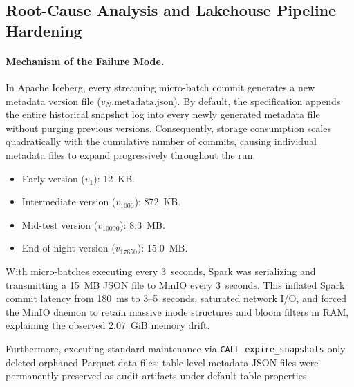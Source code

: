 \subsection{Root-Cause Analysis and Lakehouse Pipeline Hardening}
\label{subsec:eval_hardening}

\paragraph{Mechanism of the Failure Mode.}
In Apache Iceberg, every streaming micro-batch commit generates a new metadata version file ($v_N\text{.metadata.json}$). By default, the specification appends the entire historical snapshot log into every newly generated metadata file without purging previous versions. Consequently, storage consumption scales quadratically with the cumulative number of commits, causing individual metadata files to expand progressively throughout the run:
\begin{itemize}
    \item Early version ($v_1$): 12~KB.
    \item Intermediate version ($v_{1000}$): 872~KB.
    \item Mid-test version ($v_{10000}$): 8.3~MB.
    \item End-of-night version ($v_{17650}$): 15.0~MB.
\end{itemize}
With micro-batches executing every 3~seconds, Spark was serializing and transmitting a 15~MB JSON file to MinIO every 3~seconds. This inflated Spark commit latency from 180~ms to 3--5~seconds, saturated network I/O, and forced the MinIO daemon to retain massive inode structures and bloom filters in RAM, explaining the observed 2.07~GiB memory drift.

Furthermore, executing standard maintenance via \texttt{CALL expire\_snapshots} only deleted orphaned Parquet data files; table-level metadata JSON files were permanently preserved as audit artifacts under default table properties.

